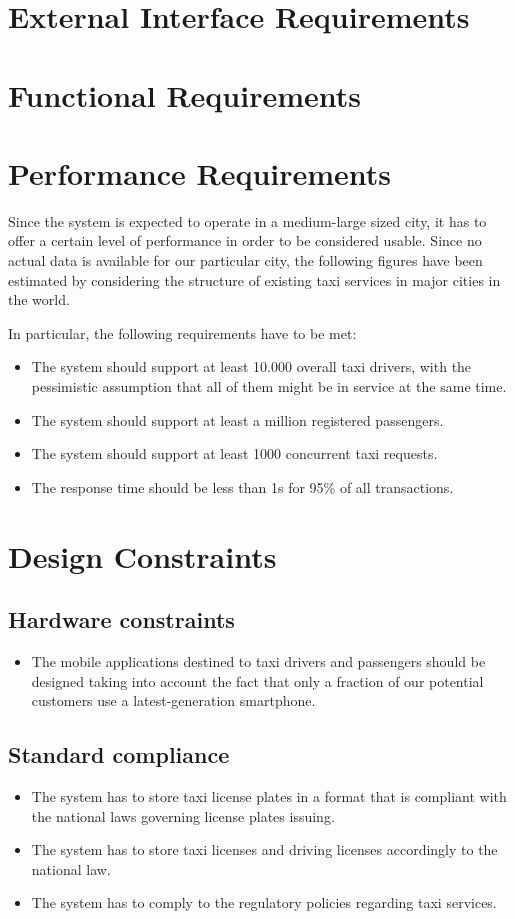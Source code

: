 \section{External Interface Requirements}
\section{Functional Requirements}
\section{Performance Requirements}
Since the system is expected to operate in a medium-large sized city, it has to offer a certain level of performance in order to be considered usable. Since no actual data is available for our particular city, the following figures have been estimated by considering the structure of existing taxi services in major cities in the world.

In particular, the following requirements have to be met:
\begin{itemize}
\item The system should support at least 10.000 overall taxi drivers, with the pessimistic assumption that all of them might be in service at the same time.
\item The system should support at least a million registered passengers.
\item The system should support at least 1000 concurrent taxi requests.
\item The response time should be less than 1s for 95\% of all transactions.
\end{itemize}


\section{Design Constraints}
\subsection{Hardware constraints}
\begin{itemize}
\item The mobile applications destined to taxi drivers and passengers should be designed taking into account the fact that only a fraction of our potential customers use a latest-generation smartphone. 
\end{itemize}


\subsection{Standard compliance}
\begin{itemize}
\item The system has to store taxi license plates in a format that is compliant with the national laws governing license plates issuing. 
\item The system has to store taxi licenses and driving licenses accordingly to the national law.
\item The system has to comply to the regulatory policies regarding taxi services. 
\end{itemize}


